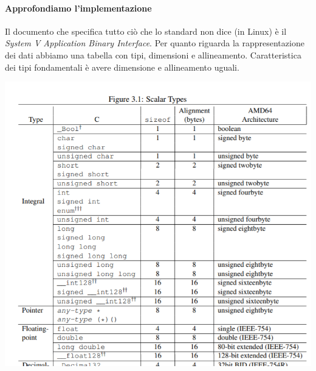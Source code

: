 			\paragraph{Approfondiamo l'implementazione} Il documento che specifica tutto ciò che lo standard non dice (in Linux) è il \emph{System V Application Binary Interface}. Per quanto riguarda la rappresentazione dei dati abbiamo una tabella con tipi, dimensioni e allineamento. Caratteristica dei tipi fondamentali è avere dimensione e allineamento uguali.
			\begin{center}
				\includegraphics[scale=0.85]{img/14.PNG}
			\end{center} 
			\clearpage 
			
